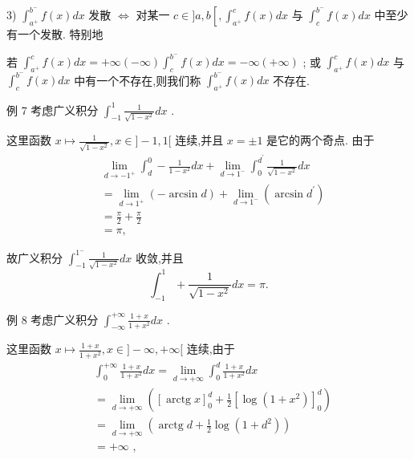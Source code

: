 3) ${\int }_{{a}^{ + }}^{{b}^{ - }}f\left( x\right) {dx}$ 发散 $\Leftrightarrow$ 对某一 $c \in  \rbrack a,b\left\lbrack  {,{\int }_{{a}^{ + }}^{c}f\left( x\right) {dx}}\right.$ 与 ${\int }_{c}^{{b}^{ - }}f\left( x\right) {dx}$ 中至少有一个发散. 特别地

若 ${\int }_{{a}^{ + }}^{c}f\left( x\right) {dx} =  + \infty \left( {-\infty }\right) {\int }_{c}^{{b}^{ - }}f\left( x\right) {dx} =  - \infty \left( {+\infty }\right)$ ; 或 ${\int }_{{a}^{ + }}^{c}f\left( x\right) {dx}$ 与 ${\int }_{c}^{{b}^{ - }}f\left( x\right) {dx}$ 中有一个不存在,则我们称 ${\int }_{{a}^{ + }}^{{b}^{ - }}f\left( x\right) {dx}$ 不存在.

例 7 考虑广义积分 ${\int }_{-1}^{1}\frac{1}{\sqrt{1 - {x}^{2}}}{dx}$ .

这里函数 $x \mapsto  \frac{1}{\sqrt{1 - {x}^{2}}},x \in  \rbrack  - 1,1\lbrack$ 连续,并且 $x =  \pm  1$ 是它的两个奇点. 由于
\begin{align*}
	&\mathop{\lim }\limits_{{d \rightarrow   - {1}^{ + }}}{\int }_{d}^{0} - \frac{1}{1 - {x}^{2}}{dx} + \mathop{\lim }\limits_{{d \rightarrow  {1}^{ - }}}{\int }_{0}^{{d}^{\prime }}\frac{1}{\sqrt{1 - {x}^{2}}}{dx}\\
	&= \mathop{\lim }\limits_{{d \rightarrow  {1}^{ + }}}\left( {-\arcsin d}\right)  + \mathop{\lim }\limits_{{d \rightarrow  {1}^{ - }}}\left( {\arcsin {d}^{\prime }}\right)\\
	&= \frac{\pi }{2} + \frac{\pi }{2}\\
	&= \pi ,
\end{align*}

故广义积分 ${\int }_{-1}^{{1}^{ - }}\frac{1}{\sqrt{1 - {x}^{2}}}{dx}$ 收敛,并且
$${\int }_{-1}^{1} + \frac{1}{\sqrt{1 - {x}^{2}}}{dx} = \pi .$$

例 8 考虑广义积分 ${\int }_{-\infty }^{+\infty }\frac{1 + x}{1 + {x}^{2}}{dx}$ .

这里函数 $x \mapsto  \frac{1 + x}{1 + {x}^{2}},x \in  \rbrack  - \infty , + \infty \lbrack$ 连续,由于
\begin{align*}
	&{\int }_{0}^{+\infty }\frac{1 + x}{1 + {x}^{2}}{dx} = \mathop{\lim }\limits_{{d \rightarrow   + \infty }}{\int }_{0}^{d}\frac{1 + x}{1 + {x}^{2}}{dx}\\
	&= \mathop{\lim }\limits_{{d \rightarrow   + \infty }}\left( {{\left\lbrack  \operatorname{arctg}x\right\rbrack  }_{0}^{d} + \frac{1}{2}{\left\lbrack  \log \left( 1 + {x}^{2}\right) \right\rbrack  }_{0}^{d}}\right)\\
	&= \mathop{\lim }\limits_{{d \rightarrow   + \infty }}\left( {\operatorname{arctg}d + \frac{1}{2}\log \left( {1 + {d}^{2}}\right) }\right)\\
	&=  + \infty \text{ , }
\end{align*}

